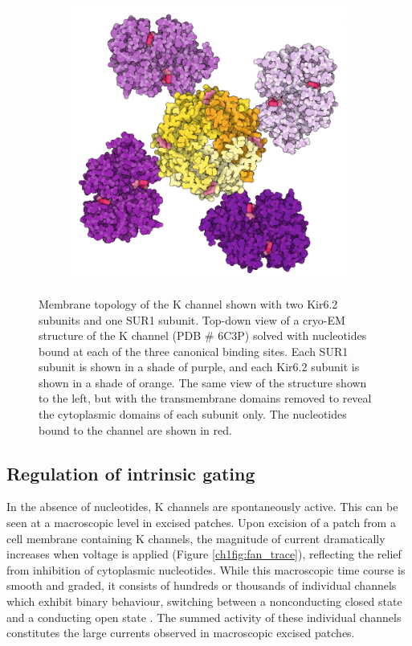 \begin{figure}[hbtp]
\begin{subfigure}[t]{0.45\textwidth}
		\includegraphics[width=\textwidth]{sur_topdown_ctd_propellor.pdf}
	\end{subfigure}
	\caption[K\ATP{} architecture and nucleotide regulation]{
		{\bf{}}
		 Membrane topology of the K\ATP{} channel shown with two Kir6.2 subunits and one SUR1 subunit.
		 Top-down view of a cryo-EM structure of the K\ATP{} channel (PDB \# 6C3P) solved with nucleotides bound at each of the three canonical binding sites.
		Each SUR1 subunit is shown in a shade of purple, and each Kir6.2 subunit is shown in a shade of orange.
		 The same view of the structure shown to the left, but with the transmembrane domains removed to reveal the cytoplasmic domains of each subunit only.
		The nucleotides bound to the channel are shown in red.
	}
\end{figure}

\subsection{Regulation of intrinsic gating}

In the absence of nucleotides, K\ATP{} channels are spontaneously active.
This can be seen at a macroscopic level in excised patches.
Upon excision of a patch from a cell membrane containing K\ATP{} channels, the magnitude of current dramatically increases when voltage is applied (Figure \ref{ch1fig:fan_trace}), reflecting the relief from inhibition of cytoplasmic nucleotides.
While this macroscopic time course is smooth and graded, it consists of hundreds or thousands of individual channels which exhibit binary behaviour, switching between a nonconducting closed state and a conducting open state \cite{hille_ion_2001}.
The summed activity of these individual channels constitutes the large currents observed in macroscopic excised patches.

